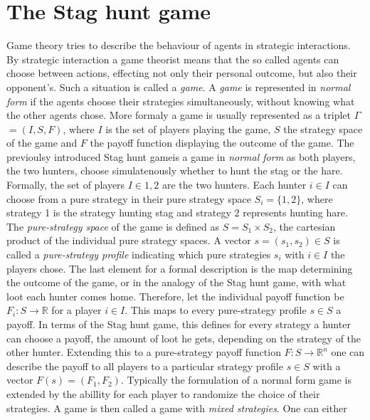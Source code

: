 \documentclass[12pt]{article}
\newcommand{\sthuga}{Stag hunt game}
\newcommand{\realnumb}{\mathbb{R}}
\newcommand{\triplet}{$\Gamma$}
\newcommand{\player}{I}
\newcommand{\strat}{S}
\newcommand{\stu}{s}
\newcommand{\pay}{F}
\begin{document}
\section{The Stag hunt game}
Game theory tries to describe the behaviour of agents in strategic interactions.
By strategic interaction a game theorist means that the so called agents
can choose between actions, effecting not only their personal outcome, but 
also their opponent's. Such a situation is called a \textit{game}. 
A \textit{game} is represented in \textit{normal form} if the agents choose
their strategies simultaneously, without knowing what the other agents chose. 
More formaly a game is usually represented as a triplet \triplet$=(\player,
\strat,\pay)$, where $\player$ is the set of players playing the game,
$\strat$ the strategy space of the game and $\pay$ the payoff function
displaying the outcome of the game. 
The previoulsy introduced \sthuga is a game in \textit{normal form} as both 
players, the two hunters, choose simulatenously whether to hunt the stag or
the hare. Formally, the set of players $\player \in  {1,2}$ are the two hunters.
Each hunter $i \in \player$ can choose from a pure strategy in their pure
strategy space $\strat_i = \{1,2\}$, where strategy 1 is the strategy hunting
stag and strategy 2 represents hunting hare. The \textit{pure-strategy space}
of the game is defined as $\strat = \strat_1 \times \strat_2$, the cartesian
product of the individual pure strategy spaces. A vector $\stu = (\stu_1,\stu_2)  \in  \strat$
is called a \textit{pure-strategy profile} indicating which pure strategies 
$s_i$ with $i \in \player$ the players chose. The last element for a formal 
description is the map determining the outcome of the game, or in the analogy
of the \sthuga, with what loot each hunter comes home. Therefore, let 
the individual payoff function be $\pay_i: \strat \rightarrow \realnumb$ for
a player $i \in \player$. This maps to every pure-strategy profile $\stu \in S$ a
payoff. In terms of the \sthuga, this defines for every strategy a hunter can
choose a payoff, the amount of loot he gets, depending on the strategy 
of the other hunter. Extending this to a pure-strategy payoff function 
$\pay: \strat \rightarrow \realnumb^n$ one can describe the payoff to all
players to a particular strategy profile $\stu \in \strat$ with a vector
$\pay(\stu) = \left(\pay_1,\pay_2\right)$. 
Typically the formulation of a normal form game is extended by the abillity
for each player to randomize the choice of their strategies. A game is then 
called a game with \textit{mixed strategies}. One can either
\end{document}
